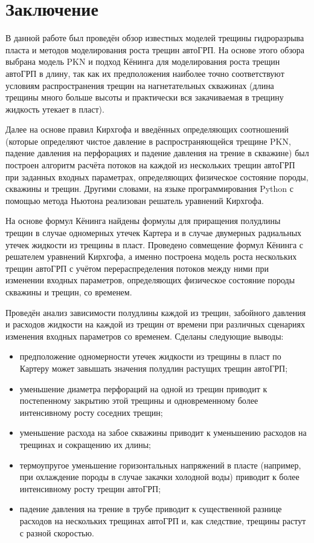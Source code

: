 \chapter*{Заключение} \label{ch-conclusion}

В данной работе был проведён обзор известных моделей трещины гидроразрыва пласта и методов моделирования роста трещин автоГРП.
На основе этого обзора выбрана модель PKN и подход Кёнинга для моделирования роста трещин автоГРП в длину, так как их предположения наиболее точно соответствуют условиям распространения трещин на нагнетательных скважинах (длина трещины много больше высоты и практически вся закачиваемая в трещину жидкость утекает в пласт). 

Далее на основе правил Кирхгофа и введённых определяющих соотношений (которые определяют чистое давление в распространяющейся трещине PKN, падение давления на перфорациях и падение давления на трение в скважине) был построен алгоритм расчёта потоков на каждой из нескольких трещин автоГРП при заданных входных параметрах, определяющих физическое состояние породы, скважины и трещин.
Другими словами, на языке программирования Python с помощью метода Ньютона реализован решатель уравнений Кирхгофа.

На основе формул Кёнинга найдены формулы для приращения полудлины трещин в случае одномерных утечек Картера и в случае двумерных радиальных утечек жидкости из трещины в пласт.
Проведено совмещение формул Кёнинга с решателем уравнений Кирхгофа, а именно построена модель роста нескольких трещин автоГРП с учётом перераспределения потоков между ними при изменении входных параметров, определяющих физическое состояние породы скважины и трещин, со временем.

Проведён анализ зависимости полудлины каждой из трещин, забойного давления и расходов жидкости на каждой из трещин от времени при различных сценариях изменения входных параметров со временем. Сделаны следующие выводы:
\begin{itemize}
	\item предположение одномерности утечек жидкости из трещины в пласт по Картеру может завышать значения полудлин растущих трещин автоГРП;
	\item уменьшение диаметра перфораций на одной из трещин приводит к постепенному закрытию этой трещины и одновременному более интенсивному росту соседних трещин;
	\item уменьшение расхода на забое скважины приводит к уменьшению расходов на трещинах и сокращению их длины;
	\item термоупругое уменьшение горизонтальных напряжений в пласте (например, при охлаждение породы в случае закачки холодной воды) приводит к более интенсивному росту трещин автоГРП;
	\item падение давления на трение в трубе приводит к существенной разнице расходов на нескольких трещинах автоГРП и, как следствие, трещины растут с разной скоростью.
\end{itemize}

